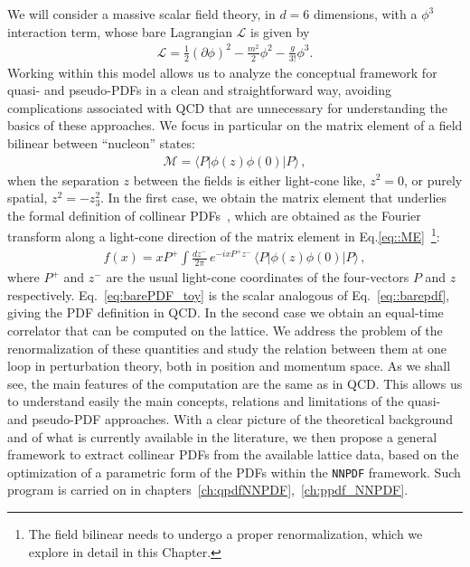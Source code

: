 We will consider a massive scalar field theory, in $d=6$ dimensions, with a
$\phi^3$ interaction term, whose bare Lagrangian $\mathcal{L}$ is given by
\begin{align}
    \label{eq:Lagrangian}
    \mathcal{L} = \frac{1}{2}\left(\partial\phi\right)^2 
    - \frac{m^2}{2} \phi^2 - \frac{g}{3!} \phi^3.
\end{align}
Working within this model allows us to analyze the conceptual framework for
quasi- and pseudo-PDFs in a clean and straightforward way, avoiding
complications associated with QCD that are unnecessary for understanding the
basics of these approaches. We focus in particular on the matrix element of a
field bilinear between ``nucleon'' states: 
\begin{align}
    \label{eq::ME}
    \mathcal{M} = 
    \langle P | \phi\left(z\right) \phi\left(0\right) | P \rangle\, ,
\end{align}
when the separation $z$ between the fields is either light-cone like, $z^2=0$,
or purely spatial, $z^2=-z_3^2$. In the first case, we obtain the matrix element
that underlies the formal definition of collinear PDFs~\cite{Collins:1980ui,
Collins:1981uw}, which are obtained as the Fourier transform along a light-cone
direction of the matrix element in Eq.\eqref{eq::ME}~\footnote{The field
bilinear needs to undergo a proper renormalization, which we explore in detail in
this Chapter. }:
\begin{align}
    \label{eq:barePDF_toy}
    f(x) = xP^+ \int \frac{dz^-}{2\pi}\, e^{-i xP^+ z^-}\,
    \langle P | \phi\left(z\right) \phi\left(0\right) | P \rangle\, ,
\end{align}
where $P^+$ and $z^-$ are the usual light-cone coordinates of the four-vectors
$P$ and $z$ respectively.
Eq.~\eqref{eq:barePDF_toy} is the scalar analogous of Eq.~\eqref{eq::barepdf}, giving the PDF definition in QCD.
In the second case we obtain an equal-time correlator
that can be computed on the lattice. We address the problem of the
renormalization of these quantities and study the relation between them at one
loop in perturbation theory, both in position and momentum space. As we shall
see, the main features of the computation are the same as in QCD. This allows us
to understand easily the main concepts, relations and limitations of the quasi-
and pseudo-PDF approaches. With a clear picture of the theoretical background
and of what is currently available in the literature, we then propose a general
framework to extract collinear PDFs from the available lattice data, based on
the optimization of a parametric form of the PDFs within the {\tt NNPDF} framework.
Such program is carried on in chapters~\ref{ch:qpdfNNPDF},~\ref{ch:ppdf_NNPDF}.

